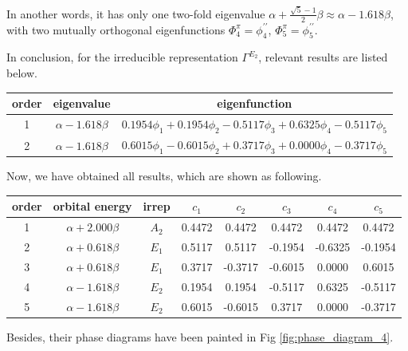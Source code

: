 \documentclass[a4paper]{book}
\newcommand\Figref[1]{Fig \ref{#1}}
\begin{document}
\begin{solution}
\begin{enumerate}[label=(\alph*)]
		In another words, it has only one two-fold eigenvalue $\alpha + \frac{ \sqrt{5}-1 }{2} \beta\approx \alpha - 1.618 \beta$, with two mutually orthogonal eigenfunctions $\Phi^\pi_4 = \phi^{\prime\prime}_4$, $\Phi^\pi_5 = \phi^{\prime\prime}_5$.
		
		In conclusion, for the irreducible representation $\Gamma^{E_2}$, relevant results are listed below.
		
		\begin{center}
		\setlength{\abovecaptionskip}{0em}
		\begin{tabular}{ccc}\hline
		  order	&	eigenvalue		& 	eigenfunction	\\ \hline
			1	&$\alpha-1.618\beta$& 	$0.1954\phi_1 + 0.1954 \phi_2 -0.5117 \phi_3 +0.6325 \phi_4 -0.5117 \phi_5$ \\
			2	&$\alpha-1.618\beta$& 	$0.6015\phi_1 - 0.6015 \phi_2 +0.3717 \phi_3 +0.0000 \phi_4 -0.3717 \phi_5$ \\	 \hline
		\end{tabular}
		\end{center}
		
		Now, we have obtained all results, which are shown as following.
		
		\begin{center}
		\setlength{\abovecaptionskip}{-0.5em}
		\begin{tabular}{cccccccc}\hline
		order 	& orbital energy & irrep & $c_1$ & $c_2$ & $c_3$ &$c_4$ &	$c_5$	\\ \hline
			1	&	$\alpha+2.000\beta$	&	$A_2$	&	0.4472	&	0.4472	&	0.4472	&	0.4472	&	0.4472	\\
			2	&	$\alpha+0.618\beta$	&	$E_1$	&	0.5117	&	0.5117	&	-0.1954	&	-0.6325	&	-0.1954	\\
			3	&	$\alpha+0.618\beta$	&	$E_1$	&	0.3717	&	-0.3717	&	-0.6015	&	0.0000	&	0.6015	\\
			4	&	$\alpha-1.618\beta$	&	$E_2$	&	0.1954	&	0.1954	&	-0.5117	&	0.6325	&	-0.5117	\\
			5	&	$\alpha-1.618\beta$	&	$E_2$	&	0.6015	&	-0.6015	&	0.3717	&	0.0000	&	-0.3717	\\ \hline
		\end{tabular}
		\end{center}
		
		Besides, their phase diagrams have been painted in \Figref{fig:phase_diagram_4}.
		

\end{enumerate}
\end{solution}
\end{document}
